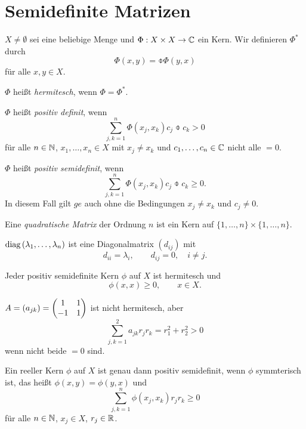 \setcounter{chapter}{1}
\chapter{Semidefinite Matrizen}
\renewcommand{\thethm}{B.\arabic{thm}}

\begin{defn} %
  $X \ne \emptyset$ sei eine beliebige Menge und $\Phi: X \times X \to \mathbb{C}$
  ein Kern. Wir definieren $\Phi^*$ durch
  \[ \Phi(x,y) = \obar{\Phi(y,x)} \]
  für alle $x, y \in X$.

  $\Phi$ heißt \emph{hermitesch}, wenn $\Phi = \Phi^*$.

  $\Phi$ heißt \emph{positiv definit}, wenn
  \[ \sum_{j,k = 1}^n \Phi(x_j, x_k) c_j \obar{c_k} > 0 \]
  für alle $n \in \mathbb{N}$, $x_1, \ldots, x_n \in X$ mit $x_j \ne x_k$ und $c_1,
  \ldots, c_n \in \mathbb{C}$ nicht alle $=0$.

  $\Phi$ heißt \emph{positiv semidefinit}, wenn
  \[ \sum_{j,k = 1}^n \Phi(x_j, x_k) c_j \obar{c_k} \ge 0. \]
  In diesem Fall gilt $ge$ auch ohne die Bedingungen $x_j \ne x_k$ und $c_j \ne
  0$.

  Eine \emph{quadratische Matrix} der Ordnung $n$ ist ein Kern auf $\{1, \ldots,
  n\} \times \{1, \ldots, n\}$.

  $\mathrm{diag}\,(\lambda_1, \ldots, \lambda_n)$ ist eine Diagonalmatrix $(d_{ij})$ mit
  \[ d_{ii} = \lambda_i, \qquad d_{ij} = 0, \quad i \ne j. \]
\end{defn}

\begin{thm} %
  Jeder positiv semidefinite Kern $\phi$ auf $X$ ist hermitesch und
  \[ \phi(x, x) \ge 0, \qquad x \in X. \]
\end{thm}

\begin{exmp*}
  $A = (a_{jk}) = \begin{pmatrix} 1 & 1 \\ -1 & 1\end{pmatrix}$ ist nicht hermitesch, aber
  \[ \sum_{j,k=1}^2 a_{jk} r_j r_k = r_1^2 + r_2^2 > 0 \]
  wenn nicht beide $= 0$ sind.
\end{exmp*}

\clearpage

\begin{thm} %
  Ein reeller Kern $\phi$ auf $X$ ist genau dann positiv semidefinit, wenn
  $\phi$ symmterisch ist, das heißt $\phi(x,y) = \phi(y,x)$ und
  \[ \sum_{j,k = 1}^n \phi(x_j, x_k) r_j r_k \ge 0 \]
  für alle $n \in \mathbb{N}$, $x_j \in X$, $r_j \in \mathbb{R}$.
\end{thm}

